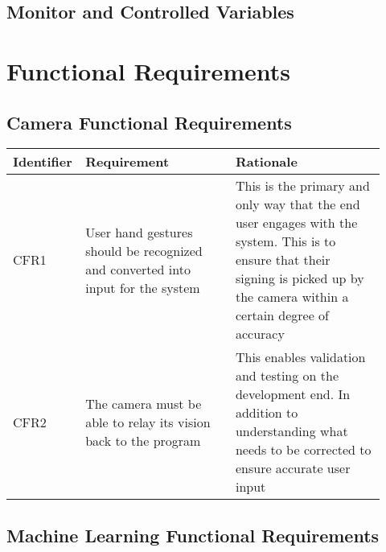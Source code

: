 \documentclass[12pt]{article}
\begin{document}
\subsection{Monitor and Controlled Variables}

\section{Functional Requirements}
\subsection{Camera Functional Requirements}

\renewcommand{\arraystretch}{1.2}
\noindent \begin{tabularx}{\textwidth}{p{0.12\linewidth}|p{0.4\linewidth}|p{0.4\linewidth}}
\toprule
\textbf{Identifier} & \textbf{Requirement} & \textbf{Rationale}\\
\midrule
CFR1 
& User hand gestures should be recognized and converted into input for the system 
& This is the primary and only way that the end user engages with the system. This is to ensure that 
their signing is picked up by the camera within a certain degree of accuracy\\
\hline
CFR2
& The camera must be able to relay its vision back to the program
& This enables validation and testing on the development end. In addition to understanding what needs 
to be corrected to ensure accurate user input\\
\bottomrule
\end{tabularx}

\subsection{Machine Learning Functional Requirements}
\end{document}

